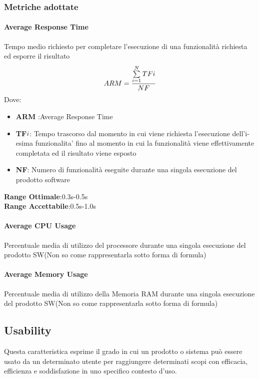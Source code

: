 \subsubsection{Metriche adottate}
\paragraph{Average Response Time}
\begin{flushleft}
Tempo medio richiesto per completare l'esecuzione di una funzionalità richiesta ed esporre il risultato
$$ARM=\frac{\sum\limits_{i=1}^N TF{\small{i}}}{NF}$$
Dove:
\begin{itemize}
\item{\textbf{ARM}} :Average Response Time
\item{\textbf{TF${\small{i}}$}}: Tempo trascorso dal momento in cui viene richiesta l'esecuzione dell'i-esima funzionalita' fino al momento in cui la funzionalità viene effettivamente completata ed il risultato viene esposto
\item{\textbf{NF}}: Numero di funzionalità eseguite durante una singola esecuzione del prodotto software
\end{itemize}
\textbf{Range Ottimale}:0.3s-0.5s \\
\textbf{Range Accettabile}:0.5s-1.0s
\end{flushleft}
\paragraph{Average CPU Usage}
\begin{flushleft}
Percentuale media di utilizzo del processore durante una singola esecuzione del prodotto SW(Non so come rappresentarla sotto forma di formula)
\end{flushleft}
\paragraph{Average Memory Usage}
\begin{flushleft}
Percentuale media di utilizzo della Memoria RAM durante una singola esecuzione del prodotto SW(Non so come rappresentarla sotto forma di formula)
\end{flushleft}

\subsection{Usability}
Questa caratteristica esprime il grado in cui un prodotto o sistema può essere usato da un determinato utente per raggiungere determinati scopi con efficacia, efficienza e soddisfazione in uno specifico contesto d'uso.
